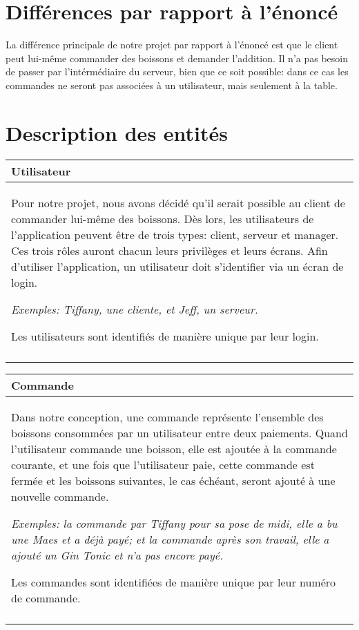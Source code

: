 \documentclass[a4paper,10pt]{article}
\begin{document}

\section{Différences par rapport à l'énoncé}

La différence principale de notre projet par rapport à l'énoncé est que le client peut lui-même commander des boissons et demander l'addition. Il n'a pas besoin de passer par l'intérmédiaire du serveur, bien que ce soit possible: dans ce cas les commandes ne seront pas associées à un utilisateur, mais seulement à la table.

\section{Description des entités}

\begin{tabu}{X}
\textbf{Utilisateur} \\
\toprule
Pour notre projet, nous avons décidé qu'il serait possible au client de commander lui-même des boissons. Dès lors, les utilisateurs de l'application peuvent être de trois types: client, serveur et manager. Ces trois rôles auront chacun leurs privilèges et leurs écrans. Afin d'utiliser l'application, un utilisateur doit s'identifier via un écran de login.

\textsl{Exemples: Tiffany, une cliente, et Jeff, un serveur.}

Les utilisateurs sont identifiés de manière unique par leur login. \\\\
\end{tabu}

\begin{tabu}{X}
\textbf{Commande} \\
\toprule

Dans notre conception, une commande représente l'ensemble des boissons consommées par un utilisateur entre deux paiements. Quand l'utilisateur commande une boisson, elle est ajoutée à la commande courante, et une fois que l'utilisateur paie, cette commande est fermée et les boissons suivantes, le cas échéant, seront ajouté à une nouvelle commande.

\textsl{Exemples: la commande  par Tiffany pour sa pose de midi, elle a bu une Maes et a déjà payé; et la commande  après son travail, elle a ajouté un Gin Tonic et n'a pas encore payé.}

Les commandes sont identifiées de manière unique par leur numéro de commande. \\\\
\end{tabu}
\end{document}
